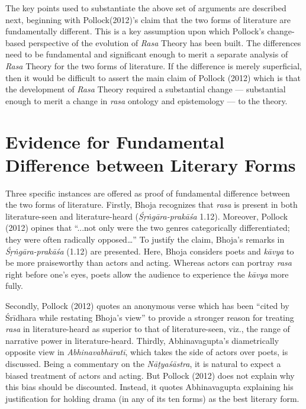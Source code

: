 The key points used to substantiate the above set of arguments are described next, beginning with Pollock(2012)’s claim that the two forms of literature are fundamentally different. This is a key assumption upon which Pollock’s change-based perspective of the evolution of \textsl{Rasa} Theory has been built. The differences need to be fundamental and significant enough to merit a separate analysis of \textsl{Rasa} Theory for the two forms of literature. If the difference is merely superficial, then it would be difficult to assert the main claim of Pollock (2012) which is that the development of \textsl{Rasa} Theory required a substantial change --- substantial enough to merit a change in \textsl{rasa }ontology and epistemology --- to the theory. 

\section*{Evidence for Fundamental Difference between Literary Forms}

Three specific instances are offered as proof of fundamental difference between the two forms of literature. Firstly, Bhoja recognizes that \textsl{rasa} is present in both literature-seen and literature-heard (\textsl{Śṛṅgāra-prakāśa} 1.12). Moreover, Pollock (2012) opines that “...not only were the two genres categorically differentiated; they were often radically opposed…” To justify the claim, Bhoja’s remarks in \textsl{Śṛṅgāra-prakāśa} (1.12) are presented. Here, Bhoja considers poets and \textsl{kāvya }to be more praiseworthy than actors and acting. Whereas actors can portray \textsl{rasa} right before one’s eyes, poets allow the audience to experience the \textsl{kāvya }more fully. 

Secondly, Pollock (2012) quotes an anonymous verse which has been “cited by Śrīdhara while restating Bhoja’s view” to provide a stronger reason for treating \textsl{rasa} in literature-heard as superior to that of literature-seen, viz., the range of narrative power in literature-heard. 
Thirdly, Abhinavagupta’s diametrically opposite view in \textsl{Abhinavabhāratī}, which takes the side of actors over poets, is discussed. Being a commentary on the \textsl{Nāṭyaśāstra}, it is natural to expect a biased treatment of actors and acting. But Pollock (2012) does not explain why this bias should be discounted. Instead, it quotes Abhinavagupta explaining his justification for holding drama (in any of its ten forms) as the best literary form. 

